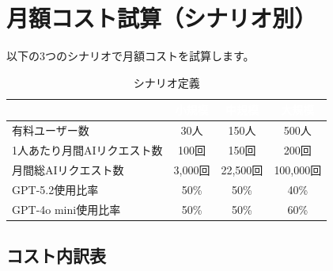 \documentclass[a4paper,11pt]{ltjsarticle}
\begin{document}
\section{月額コスト試算（シナリオ別）}

以下の3つのシナリオで月額コストを試算します。

\begin{table}[H]
\centering
\caption{シナリオ定義}
\begin{tabular}{lccc}
\toprule
\rowcolor{headerblue}\textcolor{white}{\textbf{}} & \textcolor{white}{\textbf{小規模}} & \textcolor{white}{\textbf{中規模}} & \textcolor{white}{\textbf{大規模}} \\
\midrule
有料ユーザー数 & 30人 & 150人 & 500人 \\
\rowcolor{lightgray}
1人あたり月間AIリクエスト数 & 100回 & 150回 & 200回 \\
月間総AIリクエスト数 & 3,000回 & 22,500回 & 100,000回 \\
\rowcolor{lightgray}
GPT-5.2使用比率 & 50\% & 50\% & 40\% \\
GPT-4o mini使用比率 & 50\% & 50\% & 60\% \\
\bottomrule
\end{tabular}
\end{table}

\subsection{コスト内訳表}
\end{document}
